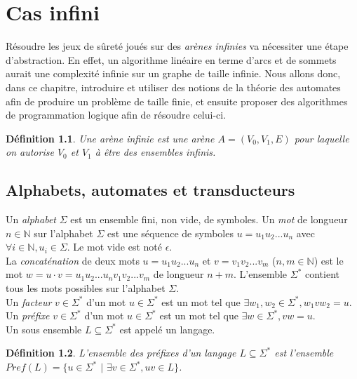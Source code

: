 \documentclass[12pt,a4paper,oneside,titlepage]{report}
\newtheorem{defi}{D\'efinition}[section]
\begin{document}
\chapter{Cas infini}
Résoudre les jeux de sûreté joués sur des \emph{arènes infinies} va nécessiter une étape d'abstraction. En effet, un algorithme linéaire en terme d'arcs et de sommets aurait une complexité infinie sur un graphe de taille infinie. Nous allons donc, dans ce chapitre, introduire et utiliser des notions de la théorie des automates afin de produire un problème de taille finie, et ensuite proposer des algorithmes de programmation logique afin de résoudre celui-ci.
\begin{defi}
Une \emph{arène infinie} est une arène $A=(V_0, V_1, E)$ pour laquelle on autorise $V_0$ et $V_1$ à être des ensembles infinis.
\end{defi}

\section{Alphabets, automates et transducteurs}
Un \emph{alphabet} $\Sigma$ est un ensemble fini, non vide, de symboles. Un \emph{mot} de longueur $n\in\mathbb{N}$ sur l'alphabet $\Sigma$ est une séquence de symboles $u=u_1u_2...u_n$ avec $\forall i\in\mathbb{N}, u_i\in \Sigma$. Le mot vide est noté $\epsilon$.\\
La \emph{concaténation} de deux mots $u=u_1u_2...u_n$ et $v=v_1v_2...v_m$ ($n,m\in\mathbb{N}$) est le mot $w=u\cdot v=u_1u_2...u_nv_1v_2...v_m$ de longueur $n+m$. L'ensemble $\Sigma^*$ contient tous les mots possibles sur l'alphabet $\Sigma$.\\
Un \emph{facteur} $v\in\Sigma^*$ d'un mot $u\in\Sigma^*$ est un mot tel que $\exists w_1,w_2\in\Sigma^*,w_1vw_2=u$.\\
Un \emph{préfixe} $v\in\Sigma^*$ d'un mot $u\in\Sigma^*$ est un mot tel que $\exists w\in\Sigma^*, vw=u$.\\
Un sous ensemble $L\subseteq \Sigma^*$ est appelé un langage.
\begin{defi}
L'ensemble des préfixes d'un langage $L\subseteq\Sigma^*$ est l'ensemble $Pref(L)=\{u\in\Sigma^*$ $|$ $\exists v\in\Sigma^*, uv\in L\}$.
\end{defi}
\end{document}
